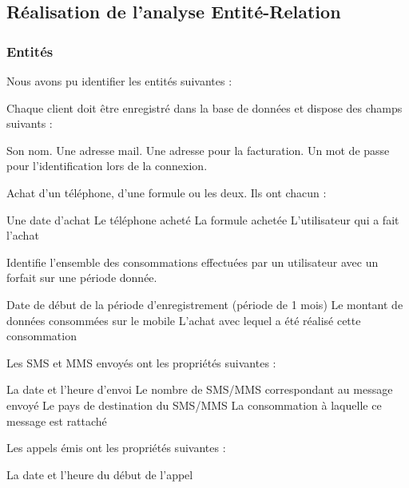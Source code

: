 \subsection{Réalisation de l'analyse Entité-Relation}

\subsubsection{Entités}

Nous avons pu identifier les entités suivantes :
\begin{itemize}
  Chaque client doit être enregistré dans la base de données et dispose des champs suivants :
  \begin{itemize}
    Son nom.
    Une adresse mail.
    Une adresse pour la facturation.
     Un mot de passe pour l'identification lors de la connexion.
  \end{itemize}
  Achat d'un téléphone, d'une formule ou les deux. Ils ont chacun :
  \begin{itemize}
     Une date d'achat
     Le téléphone acheté
     La formule achetée
     L'utilisateur qui a fait l'achat
  \end{itemize}
   Identifie l'ensemble des consommations effectuées par un utilisateur avec un forfait sur une période donnée.
  \begin{itemize}
    Date de début de la période d'enregistrement (période de 1 mois)
    Le montant de données consommées sur le mobile
    L'achat avec lequel a été réalisé cette consommation
  \end{itemize}
   Les SMS et MMS envoyés ont les propriétés suivantes :
  \begin{itemize}
     La date et l'heure d'envoi
     Le nombre de SMS/MMS correspondant au message envoyé
     Le pays de destination du SMS/MMS
     La consommation à laquelle ce message est rattaché
  \end{itemize}
   Les appels émis ont les propriétés suivantes :
  \begin{itemize}
     La date et l'heure du début de l'appel

\end{itemize}
\end{itemize}
